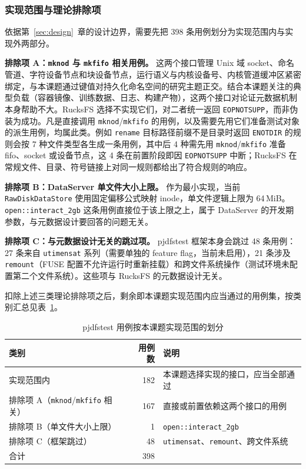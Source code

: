 \subsubsection{实现范围与理论排除项}

依据第~\ref{sec:design}~章的设计边界，需要先把 398 条用例划分为实现范围内与实现外两部分。

\textbf{排除项 A：\texttt{mknod} 与 \texttt{mkfifo} 相关用例。} 这两个接口管理 Unix 域 socket、命名管道、字符设备节点和块设备节点，运行语义与内核设备号、内核管道缓冲区紧密绑定，与本课题通过键值对持久化命名空间的研究主题正交。结合本课题关注的典型负载（容器镜像、训练数据、日志、构建产物），这两个接口对论证元数据机制本身帮助不大。RucksFS 选择不实现它们，对二者统一返回 \texttt{EOPNOTSUPP}，而非伪装为成功。凡是直接调用 \texttt{mknod}/\texttt{mkfifo} 的用例，以及需要先用它们准备测试对象的派生用例，均属此类。例如 \texttt{rename} 目标路径前缀不是目录时返回 \texttt{ENOTDIR} 的规则会按 7 种文件类型各生成一条用例，其中后 4 种需先用 \texttt{mknod}/\texttt{mkfifo} 准备 fifo、socket 或设备节点，这 4 条在前置阶段即因 \texttt{EOPNOTSUPP} 中断；RucksFS 在常规文件、目录、符号链接上对同一规则都给出了符合规则的响应。

\textbf{排除项 B：DataServer 单文件大小上限。} 作为最小实现，当前 \texttt{RawDiskDataStore} 使用固定偏移公式映射 inode，单文件逻辑上限为 64\,MiB。\texttt{open::interact\_2gb} 这条用例直接位于该上限之上，属于 DataServer 的开发期参数，与元数据设计要回答的问题无关。

\textbf{排除项 C：与元数据设计无关的跳过项。} pjdfstest 框架本身会跳过 48 条用例：27 条来自 \texttt{utimensat} 系列（需要单独的 feature flag，当前未启用），21 条涉及 \texttt{remount}（FUSE 配置不允许运行时重新挂载）和跨文件系统操作（测试环境未配置第二个文件系统）。这些项与 RucksFS 的元数据设计无关。

扣除上述三类理论排除项之后，剩余即本课题实现范围内应当通过的用例集，按类别汇总见表~\ref{tab:pjdfstest-scope}。

\begin{table}[htbp]
    \centering
    \caption{pjdfstest 用例按本课题实现范围的划分}
    \label{tab:pjdfstest-scope}
    \small
    \begin{tabular}{lrl}
        \toprule
        类别 & 用例数 & 说明 \\
        \midrule
        实现范围内                                      & 182 & 本课题选择实现的接口，应当全部通过 \\
        排除项 A（\texttt{mknod}/\texttt{mkfifo} 相关）  & 167 & 直接或前置依赖这两个接口的用例 \\
        排除项 B（单文件大小上限）                       & 1   & \texttt{open::interact\_2gb} \\
        排除项 C（框架跳过）                            & 48  & \texttt{utimensat}、\texttt{remount}、跨文件系统 \\
        \midrule
        合计                                            & 398 & \\
        \bottomrule
    \end{tabular}
\end{table}

